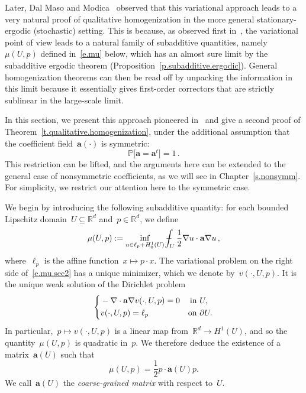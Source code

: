 \documentclass[11pt,twoside]{article} %
\numberwithin{equation}{section}
\theoremstyle{definition}
\let\originalleft\left
\let\originalright\right
\renewcommand{\left}{\mathopen{}\mathclose\bgroup\originalleft}
\renewcommand{\right}{\aftergroup\egroup\originalright}
\newcommand*{\Rd}{\ensuremath{\mathbb{R}^d}}
\renewcommand{\a}{\mathbf{a}}
\renewcommand{\P}{\mathbb{P}}
\def\Xint#1{\mathchoice
{\XXint\displaystyle\textstyle{#1}}%
{\XXint\textstyle\scriptstyle{#1}}%
{\XXint\scriptstyle\scriptscriptstyle{#1}}%
{\XXint\scriptscriptstyle\scriptscriptstyle{#1}}%
\!\int}
\def\XXint#1#2#3{{\setbox0=\hbox{$#1{#2#3}{\int}$}
\vcenter{\hbox{$#2#3$}}\kern-.5\wd0}}
\def\fint{\Xint-}
\begin{document}
\smallskip

Later, Dal Maso and Modica~\cite{DM1,DM2} observed that this variational approach leads to a very natural proof of qualitative homogenization in the more general stationary-ergodic (stochastic) setting. This is because, as observed first in~\cite{DM1}, the variational point of view leads to a natural family of subadditive quantities, namely~$\mu(U,p)$ defined in~\eqref{e.mu} below, which has an almost sure limit by the subadditive ergodic theorem (Proposition~\ref{p.subadditive.ergodic}). General homogenization theorems can then be read off by unpacking the information in this limit because it essentially gives first-order correctors that are strictly sublinear in the large-scale limit.

\smallskip

In this section, we present this approach pioneered in~\cite{DGS,DM1,DM2} and give a second proof of Theorem~\ref{t.qualitative.homogenization}, under the additional assumption that the coefficient field~$\a(\cdot)$ is symmetric: 
\begin{equation}
\label{e.symm.sec24}
\P \bigl[  \a = \a^t \bigr] = 1 \,.
\end{equation}
This restriction can be lifted, and the arguments here can be extended to the general case of nonsymmetric coefficients, as we will see in Chapter~\ref{s.nonsymm}. For simplicity, we restrict our attention here to the symmetric case. 

\smallskip

We begin by introducing the following subadditive quantity: 
for each bounded Lipschitz domain~$U\subseteq \Rd$ and~$p\in\Rd$, we define
\begin{equation}
\label{e.mu.sec2}
\mu(U,p) 
:= \inf_{u \in \ell_p+H^1_0(U)} 
\fint_U \frac12\nabla u \cdot \a\nabla u
\,,
\end{equation}
where~$\ell_p$ is the affine function~$x\mapsto p\cdot x$.
The variational problem on the right side of~\eqref{e.mu.sec2} has a unique minimizer, which we denote by~$v(\cdot,U,p)$. It is the unique weak solution of the Dirichlet problem 
\begin{equation}
\label{e.DP.sec24}
\left\{
\begin{aligned}
& -\nabla \cdot \a\nabla v(\cdot,U,p) = 0 & \mbox{in} & \ U,  \\
& v(\cdot,U,p) = \ell_p & \mbox{on} & \ \partial U.
\end{aligned}
\right.
\end{equation}
In particular,~$p\mapsto v(\cdot,U,p)$ is a linear map from~$\Rd\to H^1(U)$, and so the quantity~$\mu(U,p)$ is quadratic in~$p$. We therefore deduce the existence of a matrix~$\a(U)$ such that 
\begin{equation}
\label{e.quad.mu.sec2}
\mu(U,p) = \frac12 p\cdot \a(U) p. 
\end{equation}
We call~$\a(U)$ the \emph{coarse-grained matrix} with respect to~$U$. 
\end{document}
